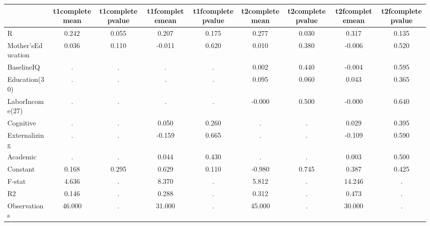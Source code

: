 \begin{table}[htbp]
\begin{tabular}{lcccccccc} \hline \hline
 & t1completemean  & t1completepvalue  & t1fcompletemean  & t1fcompletepvalue  & t2completemean  & t2completepvalue  & t2fcompletemean  & t2fcompletepvalue  \\  \hline 
R &     0.242 &     0.055 &     0.207 &     0.175 &     0.277 &     0.030 &     0.317 &     0.135 \\  
Mother'sEducation &     0.036 &     0.110 &    -0.011 &     0.620 &     0.010 &     0.380 &    -0.006 &     0.520 \\  
BaselineIQ &         . &         . &         . &         . &     0.002 &     0.440 &    -0.004 &     0.595 \\  
Education(30) &         . &         . &         . &         . &     0.095 &     0.060 &     0.043 &     0.365 \\  
LaborIncome(27) &         . &         . &         . &         . &    -0.000 &     0.500 &    -0.000 &     0.640 \\  
Cognitive &         . &         . &     0.050 &     0.260 &         . &         . &     0.029 &     0.395 \\  
Externalizing &         . &         . &    -0.159 &     0.665 &         . &         . &    -0.109 &     0.590 \\  
Academic &         . &         . &     0.044 &     0.430 &         . &         . &     0.003 &     0.500 \\  
Constant &     0.168 &     0.295 &     0.629 &     0.110 &    -0.980 &     0.745 &     0.387 &     0.425 \\  
F-stat &     4.636 &         . &     8.370 &         . &     5.812 &         . &    14.246 &         . \\  
R2 &     0.146 &         . &     0.288 &         . &     0.312 &         . &     0.473 &         . \\  
Observations &    46.000 &         . &    31.000 &         . &    45.000 &         . &    30.000 &         . \\  
\hline \hline \end{tabular}
\end{table}
